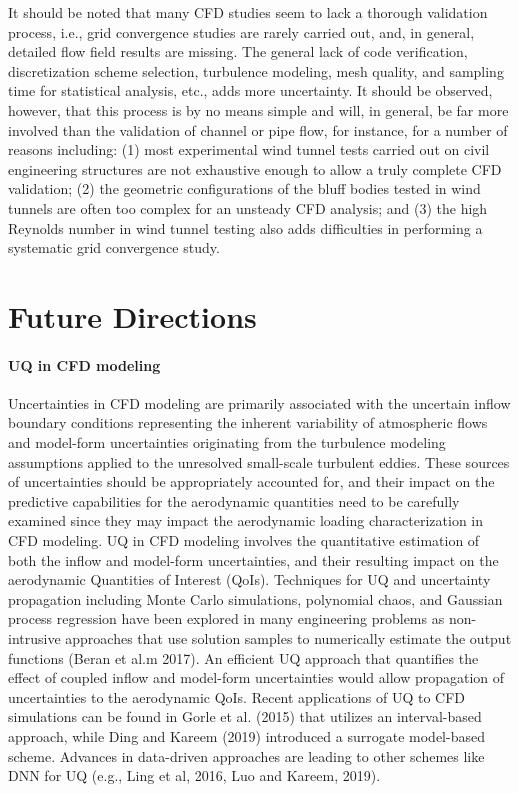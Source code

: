 It should be noted that many CFD studies seem to lack a thorough validation process, i.e., grid convergence studies are rarely carried out, and, in general, detailed flow field results are missing. The general lack of code verification, discretization scheme selection, turbulence modeling, mesh quality, and sampling time for statistical analysis, etc., adds more uncertainty. It should be observed, however, that this process is by no means simple and will, in general, be far more involved than the validation of channel or pipe flow, for instance, for a number of reasons including: (1) most experimental wind tunnel tests carried out on civil engineering structures are not exhaustive enough to allow a truly complete CFD validation; (2) the geometric configurations of the bluff bodies tested in wind tunnels are often too complex for an unsteady CFD analysis; and (3) the high Reynolds number in wind tunnel testing also adds difficulties in performing a systematic grid convergence study.

\section{Future Directions}
\label{sec:resp_cfd_wind_flow_modeling}

\paragraph{UQ in CFD modeling} Uncertainties in CFD modeling are primarily associated with the uncertain inflow boundary conditions representing the inherent variability of atmospheric flows and model-form uncertainties originating from the turbulence modeling assumptions applied to the unresolved small-scale turbulent eddies. These sources of uncertainties should be appropriately accounted for, and their impact on the predictive capabilities for the aerodynamic quantities need to be carefully examined since they may impact the aerodynamic loading characterization in CFD modeling. UQ in CFD modeling involves the quantitative estimation of both the inflow and model-form uncertainties, and their resulting impact on the aerodynamic Quantities of Interest (QoIs). Techniques for UQ and uncertainty propagation including Monte Carlo simulations, polynomial chaos, and Gaussian process regression have been explored in many engineering problems as non-intrusive approaches that use solution samples to numerically estimate the output functions (Beran et al.m 2017). An efficient UQ approach that quantifies the effect of coupled inflow and model-form uncertainties would allow propagation of uncertainties to the aerodynamic QoIs. Recent applications of UQ to CFD simulations can be found in Gorle et al. (2015) that utilizes an interval-based approach, while Ding and Kareem (2019) introduced a surrogate model-based scheme. Advances in data-driven approaches are leading to other schemes like DNN for UQ (e.g., Ling et al, 2016, Luo and Kareem, 2019).

